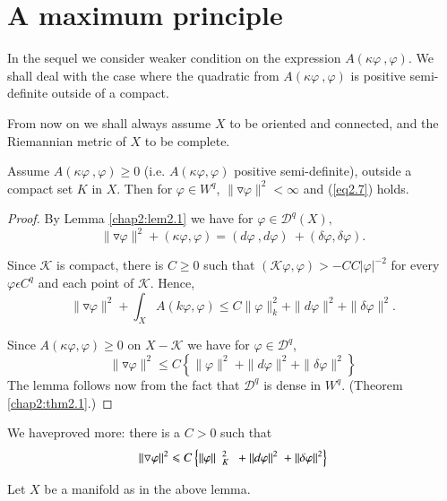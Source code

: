 \section{A maximum principle}%

In the  sequel we consider weaker condition on the expression $A
(\kappa \varphi~,\varphi)$. We shall deal with the case where the
quadratic from $A (\kappa \varphi~,\varphi)$ is positive semi-
definite outside of a compact. 

From now on we shall always assume $X$ to be oriented and 
connected, and the Riemannian metric of $X$ to be complete. 

\begin{lemma}\label{chap2:lem2.3}%
  Assume $A (\kappa \varphi~,\varphi)\ge 0$ (i.e. $A (\kappa
  \varphi,\varphi)$ positive semi-definite), outside a compact  set $K$
  in $X$. Then for  $\varphi \in W^q$, $\parallel \triangledown
  \varphi \parallel^2 <\infty $ \;\; and (\ref{eq2.7}) holds. 
\end{lemma}

\begin{proof}
  By Lemma \ref{chap2:lem2.1} we have for $\varphi \in \mathcal{D}^q(X),$
  $$
  \parallel \triangledown \varphi \parallel^2+ (\kappa
  \varphi,\varphi)= (d \varphi~,d \varphi)~+(\delta \varphi, \delta
  \varphi).
  $$ 

  Since $\mathcal{K}$ is compact, there is $C \ge 0$ such that $(\mathcal{K}
  \varphi, \varphi)> -CC |\varphi|^{-2}$ for every $\varphi \epsilon
  C^q$ and each point of $\mathcal{K}$. Hence, 
  $$
  \parallel \triangledown \varphi \parallel^2 +\int_X A(k \varphi ,
  \varphi)\le C \parallel \varphi \parallel_k^2  + \parallel d \varphi
  \parallel^2 + \parallel \delta \varphi \parallel^2.
  $$ 

  Since $A(\kappa \varphi,\varphi) \ge 0$ on $X-\mathcal{K}$ we have
  for $\varphi  \in \mathcal{D}^q$, 
  $$
  \parallel \triangledown \varphi \parallel^2 \le C \left\{ \parallel
  \varphi \parallel^2~+ \parallel d \varphi \parallel^2 +\parallel
  \delta \varphi \parallel^2 \right \}
  $$
  The lemma follows now from the fact that $\mathcal{D}^q$ is dense in $W^q$.
  (Theorem \ref{chap2:thm2.1}.)
\end{proof}

\begin{remark*}
  We have\pageoriginale proved more: there is a $C > 0$ such that 
  \begin{equation*} 
    \Arrowvert \triangledown  \varphi \Arrowvert^2 \leqslant C \left\{
    \Arrowvert \varphi \Arrowvert~~ ^2_K ~~ + \Arrowvert d \varphi
    \Arrowvert^2 ~ + \Arrowvert \delta \varphi \Arrowvert ^2 \right\} 
  \end{equation*}

  Let $X$ be a manifold as in the above lemma.
\end{remark*}

